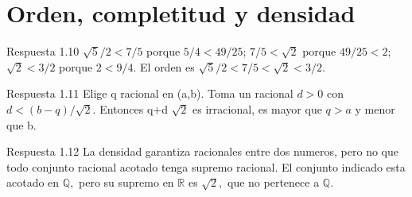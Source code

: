 \documentclass[10pt,a4paper,oneside,openany]{book}
\begin{document}
\section{Orden, completitud y densidad}
\begin{PSevenAnswerFixed}{Respuesta 1.10}
\(\sqrt{5}/2<7/5\) porque \(5/4<49/25\); \(7/5<\sqrt{2}\) porque \(49/25<2\); \(\sqrt{2}<3/2\) porque \(2<9/4\). El orden es \(\sqrt{5}/2<7/5<\sqrt{2}<3/2\).
\end{PSevenAnswerFixed}
\begin{PSevenAnswerFixed}{Respuesta 1.11}
Elige q racional en (a,b). Toma un racional \(d>0\) con \(d<(b-q)/\sqrt{2}\). Entonces q+d \(\sqrt{2}\) es irracional, es mayor que \(q>a\) y menor que b.
\end{PSevenAnswerFixed}
\begin{PSevenAnswerFixed}{Respuesta 1.12}
La densidad garantiza racionales entre dos numeros, pero no que todo conjunto racional acotado tenga supremo racional. El conjunto indicado esta acotado en \(\mathbb{Q},\) pero su supremo en \(\mathbb{R}\) es \(\sqrt{2},\) que no pertenece a \(\mathbb{Q}\).
\end{PSevenAnswerFixed}
\end{document}
